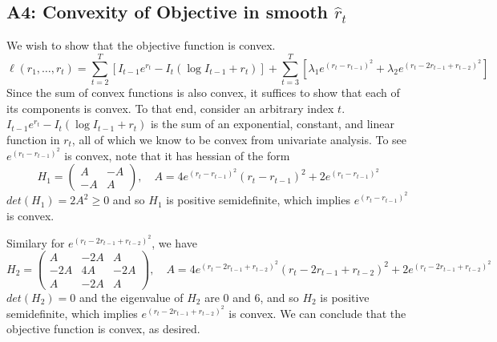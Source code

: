 \documentclass[12pt]{article}
\begin{document}
    \subsection{A4: Convexity of Objective in smooth $\hat{r}_t$} \label{app: convex}
      We wish to show that the objective function is convex.
      \[\ell(r_1,\dots,r_t) = \sum_{t = 2}^T [I_{t - 1}e^{r_t} - I_t(\log{I_{t - 1}} + r_t)]
         + \sum_{t = 3}^T [\lambda_1 e^{(r_t - r_{t - 1})^2} + \lambda_2 e^{(r_t - 2r_{t - 1} + r_{t -2})^2}] \]
      Since the sum of convex functions is also convex, it suffices to show that each of its components is convex. To that end, consider an 
      arbitrary index $t$. $I_{t - 1}e^{r_t} - I_t(\log{I_{t - 1}} + r_t)$ is the sum of an exponential, constant, and linear function in $r_t$,
      all of which we know to be convex from univariate analysis. To see $e^{(r_t - r_{t - 1})^2}$ is convex, note that it has hessian of the form
      \[ H_1 = \begin{pmatrix} A & -A \\ -A & A \end{pmatrix}, \quad A = 4e^{(r_t - r_{t - 1})^2}(r_t - r_{t - 1})^2 + 2e^{(r_t - r_{t - 1})^2} \]
      $det(H_1) = 2A^2 \geq 0$ and so $H_1$ is positive semidefinite, which implies $e^{(r_t - r_{t - 1})^2}$ is convex.

      Similary for $e^{(r_t - 2r_{t - 1} + r_{t -2})^2}$, we have 
      \[ H_2 = \begin{pmatrix} A & -2A & A \\ -2A & 4A & -2A \\ A & -2A & A \end{pmatrix}, 
      \quad A = 4e^{(r_t - 2r_{t - 1} + r_{t -2})^2}(r_t - 2r_{t - 1} + r_{t -2})^2 + 2e^{(r_t - 2r_{t - 1} + r_{t -2})^2} \]
      $det(H_2) = 0$ and the eigenvalue of $H_2$ are 0 and 6, and so $H_2$ is positive semidefinite, which implies $e^{(r_t - 2r_{t - 1} + r_{t -2})^2}$ is convex. 
      We can conclude that the objective function is convex, as desired.


      \newpage 



\end{document}
